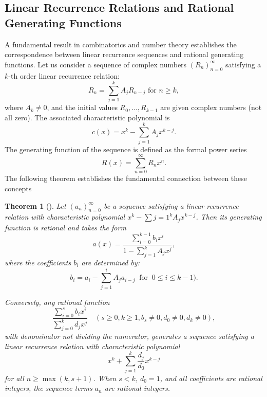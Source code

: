 \documentclass{amsart}[12pt]
\newtheorem{theorem}{Theorem}%
\theoremstyle{definition}
\begin{document}
\subsection{Linear Recurrence Relations and Rational Generating Functions}
A fundamental result in combinatorics and number theory establishes the correspondence between linear recurrence sequences and rational generating functions.
Let us consider a sequence of complex numbers $(R_n)_{n=0}^\infty$ satisfying a $k$-th order linear recurrence relation:
\[
R_n = \sum_{j=1}^{k} A_j R_{n-j} \text{ for } n\geq k,
\]
where $A_k \neq 0$, and the initial values $R_0, \ldots, R_{k-1}$ are given complex numbers (not all zero). The associated characteristic polynomial is
\[
c(x) = x^k - \sum_{j=1}^{k}A_j x^{k-j}.
\]
The generating function of the sequence is defined as the formal power series
\[
R(x) = \sum_{n=0}^{\infty}R_nx^n.
\]
The following theorem establishes the fundamental connection between these concepts
\begin{theorem}[{\cite{JoKiss}}]\label{recseq}
	Let $(a_n)_{n=0}^\infty$ be a sequence satisfying a linear recurrence relation with characteristic polynomial $x^k - \sum{j=1}^k A_j x^{k-j}$.
Then its generating function is rational and takes the form
\[	
a(x) =\frac{\sum_{i=0}^{k-1}b_ix^i}{1 - \sum_{j=1}^{k}A_j x^j},
\]
where the coefficients $b_i$ are determined by:	
\[	
b_i = a_i - \sum_{j=1}^{i}	A_j a_{i-j} \ \text{ for }	\ 0\leq i \leq k - 1 ).
\]

Conversely, any rational function
\[	
\frac{\sum_{i=0}^{s}b_ix^i}{\sum_{j=0}^{k}d_jx^j} \quad (s\geq0, k\geq 1,b_s\neq 0, d_0 \neq 0, d_k\neq 0),
\]
with denominator not dividing the numerator, generates a sequence satisfying a linear recurrence relation with characteristic polynomial
\[	
x^k +\sum_{j=1}^{k}\frac{d_j}{d_0}x^{k-j}
\]
for all $n \geq \max(k, s+1)$. When $s < k$, $d_0 = 1$, and all coefficients are rational integers, the sequence terms $a_n$ are rational integers.
\end{theorem}
\end{document}
